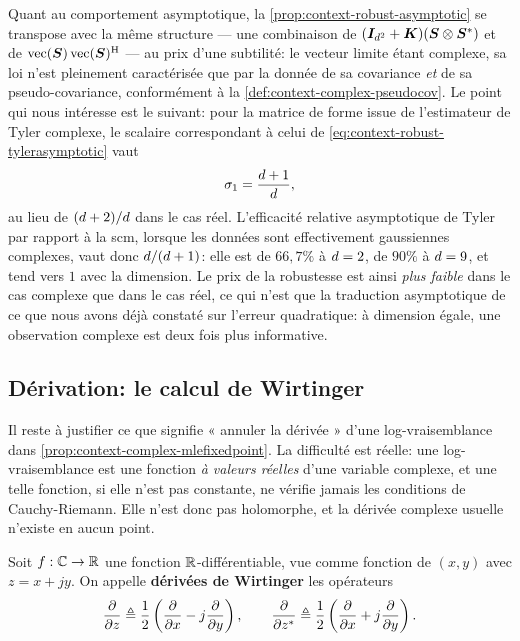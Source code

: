 Quant au comportement asymptotique, la \cref{prop:context-robust-asymptotic} se transpose avec la même structure — une combinaison de $(\boldsymbol{I}_{d^2}+\boldsymbol{K})(\boldsymbol{S}\otimes{\boldsymbol{S}}^{*})$ et de $\operatorname{vec}(\boldsymbol{S})\operatorname{vec}(\boldsymbol{S})^{\mathrm{H}}$ — au prix d'une subtilité: le vecteur limite étant complexe, sa loi n'est pleinement caractérisée que par la donnée de sa covariance \emph{et} de sa pseudo-covariance, conformément à la \cref{def:context-complex-pseudocov}. Le point qui nous intéresse est le suivant: pour la matrice de forme issue de l'estimateur de Tyler complexe, le scalaire correspondant à celui de \cref{eq:context-robust-tylerasymptotic} vaut
\begin{equation}
  \sigma_1 = \frac{d+1}{d},
  \label{eq:context-complex-tylerasymptotic}
\end{equation}
au lieu de $(d+2)/d$ dans le cas réel. L'efficacité relative asymptotique de Tyler par rapport à la scm, lorsque les données sont effectivement gaussiennes complexes, vaut donc $d/(d+1)$: elle est de $66,7\%$ à $d=2$, de $90\%$ à $d=9$, et tend vers $1$ avec la dimension. Le prix de la robustesse est ainsi \emph{plus faible} dans le cas complexe que dans le cas réel, ce qui n'est que la traduction asymptotique de ce que nous avons déjà constaté sur l'erreur quadratique: à dimension égale, une observation complexe est deux fois plus informative.

\subsection{Dérivation: le calcul de Wirtinger}

Il reste à justifier ce que signifie « annuler la dérivée » d'une log-vraisemblance dans \cref{prop:context-complex-mlefixedpoint}. La difficulté est réelle: une log-vraisemblance est une fonction \emph{à valeurs réelles} d'une variable complexe, et une telle fonction, si elle n'est pas constante, ne vérifie jamais les conditions de Cauchy-Riemann. Elle n'est donc pas holomorphe, et la dérivée complexe usuelle n'existe en aucun point.

\begin{definition}
\label{def:context-complex-wirtinger}
  Soit $f:\mathbb{C}\to\mathbb{R}$ une fonction $\mathbb{R}$-différentiable, vue comme fonction de $(x,y)$ avec $z=x+jy$. On appelle \textbf{dérivées de Wirtinger}  les opérateurs
  \begin{equation}
    \frac{\partial}{\partial z}
    \triangleq
    \frac{1}{2}\left(\frac{\partial}{\partial x} - j\frac{\partial}{\partial y}\right),
    \qquad
    \frac{\partial}{\partial {z}^{*}}
    \triangleq
    \frac{1}{2}\left(\frac{\partial}{\partial x} + j\frac{\partial}{\partial y}\right).
    \label{eq:context-complex-wirtinger}
  \end{equation}
\end{definition}

